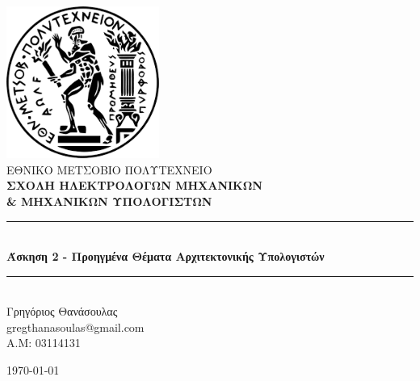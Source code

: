 \documentclass[12pt]{article}
\begin{document}
\sloppy
\begin{titlepage}



\newcommand{\HRule}{\rule{\linewidth}{0.5mm}}
\center
\includegraphics[width=50mm,scale=0.5]{imgs/logo.png}\\[1cm]
\textsc{\LARGE ΕΘΝΙΚΟ ΜΕΤΣΟΒΙΟ ΠΟΛΥΤΕΧΝΕΙΟ}\\[0.05cm] %
\textsc{\textbf{\Large ΣΧΟΛΗ ΗΛΕΚΤΡΟΛΟΓΩΝ ΜΗΧΑΝΙΚΩΝ \\ \& ΜΗΧΑΝΙΚΩΝ ΥΠΟΛΟΓΙΣΤΩΝ}}\\[1.cm] %

\vspace{05mm}
\HRule \\[0.4cm]
{ \huge \bfseries Άσκηση 2 - Προηγμένα Θέματα Αρχιτεκτονικής Υπολογιστών }\\[0.4cm] 
\HRule \\[1.5cm]
 
\center
{\Large Γρηγόριος Θανάσουλας \\ \vspace{1em} gregthanasoulas@gmail.com \\ \vspace{5mm} \Large A.M: 03114131} \\
\vspace{15mm}

{\large \today} %
\vfill

\end{titlepage}
\end{document}

